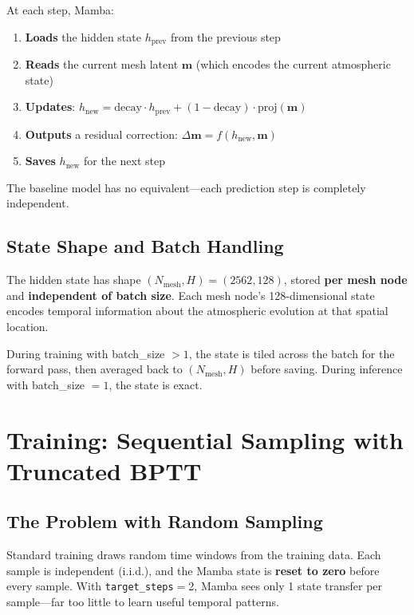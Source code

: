 \documentclass[11pt,a4paper]{article}
\begin{document}
At each step, Mamba:
\begin{enumerate}[nosep]
  \item \textbf{Loads} the hidden state $h_\text{prev}$ from the previous step
  \item \textbf{Reads} the current mesh latent $\mathbf{m}$ (which encodes the current atmospheric state)
  \item \textbf{Updates}: $h_\text{new} = \text{decay} \cdot h_\text{prev} + (1-\text{decay}) \cdot \text{proj}(\mathbf{m})$
  \item \textbf{Outputs} a residual correction: $\Delta\mathbf{m} = f(h_\text{new}, \mathbf{m})$
  \item \textbf{Saves} $h_\text{new}$ for the next step
\end{enumerate}

The baseline model has no equivalent---each prediction step is completely independent.

\subsection{State Shape and Batch Handling}

The hidden state has shape $(N_\text{mesh}, H) = (2562, 128)$, stored \textbf{per mesh node} and \textbf{independent of batch size}. Each mesh node's 128-dimensional state encodes temporal information about the atmospheric evolution at that spatial location.

During training with batch\_size $> 1$, the state is tiled across the batch for the forward pass, then averaged back to $(N_\text{mesh}, H)$ before saving. During inference with batch\_size $= 1$, the state is exact.

\section{Training: Sequential Sampling with Truncated BPTT}

\subsection{The Problem with Random Sampling}

Standard training draws random time windows from the training data. Each sample is independent (i.i.d.), and the Mamba state is \textbf{reset to zero} before every sample. With \texttt{target\_steps}$=$2, Mamba sees only 1 state transfer per sample---far too little to learn useful temporal patterns.
\end{document}
